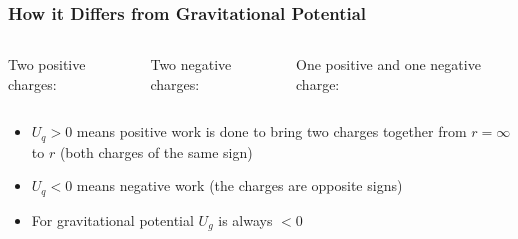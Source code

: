 \documentclass[12pt,aspectratio=169]{beamer}
\begin{document}
\begin{frame}
  \frametitle{How it Differs from Gravitational Potential}
  \begin{columns}
    \begin{center}
      Two positive charges:

      \vspace{-0.3in}{\Large
        \begin{displaymath}
          U_q>0
        \end{displaymath}
      }
    \end{center}
    \begin{center}
      Two negative charges:

      \vspace{-0.3in}{\Large
        \begin{displaymath}
          U_q>0
        \end{displaymath}
      }
    \end{center}
    \begin{center}
      One positive and one negative charge:

      \vspace{-0.5in}{\Large
        \begin{displaymath}
          U_q<0
        \end{displaymath}
      }
    \end{center}
  \end{columns}

  \vspace{.4in}
  \begin{itemize}
  \item $U_q>0$ means positive work is done to bring two charges together from
   $r=\infty$ to $r$ (both charges of the same sign)
  \item $U_q<0$ means negative work (the charges are opposite signs)
  \item For gravitational potential $U_g$ is always $<0$
  \end{itemize}
\end{frame}
\end{document}
